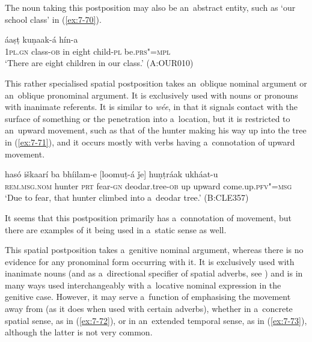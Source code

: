The noun taking this postposition may also be an~abstract entity, such as `our school class' in (\ref{ex:7-70}).

\begin{exe}
\ex
\label{ex:7-70}
 áaṣṭ kuṇaak-á hín-a \\
\textsc{1pl.gn} class-\textsc{ob} in eight child-\textsc{pl}  be.\textsc{prs"=mpl} \\
\glt `There are eight children in our class.' (A:OUR010)
\end{exe}


   This rather specialised spatial postposition takes an~oblique nominal argument or an~oblique pronominal argument. It is exclusively used with nouns or pronouns with inanimate referents. It is similar to \textit{wée}, in that it signals contact with the surface of something or the penetration into a~location, but it is restricted to an~upward movement, such as that of the hunter making his way up into the tree in (\ref{ex:7-71}), and it occurs mostly with verbs having a~connotation of upward movement. 

\begin{exe}
\ex
\label{ex:7-71}
\gll hasó iškaarí ba bhíilam-e [loomuṭ-á ǰe] huṇṭráak ukháat-u \\
\textsc{rem.msg.nom} hunter \textsc{prt} fear-\textsc{gn}  deodar.tree-\textsc{ob} up upward come.up.\textsc{pfv"=msg} \\
\glt `Due to fear, that hunter climbed into a~deodar tree.' (B:CLE357)
\end{exe}

It seems that this postposition primarily has a~connotation of movement, but there are examples of it being used in a~static sense as well.


 This spatial postposition takes a~genitive nominal argument, whereas there is no evidence for any pronominal form occurring with it. It is exclusively used with inanimate nouns (and as a~directional specifier of spatial adverbs, see ) and is in many ways used interchangeably with a~locative nominal expression in the genitive case. However, it may serve a~function of emphasising the movement away from (as it does when used with certain adverbs), whether in a~concrete spatial sense, as in (\ref{ex:7-72}), or in an~extended temporal sense, as in (\ref{ex:7-73}), although the latter is not very common.


